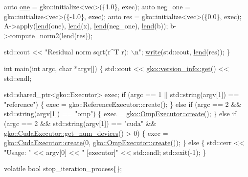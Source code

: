 \begin{DoxyCodeInclude}
    \textcolor{keyword}{auto} \hyperlink{namespacegko_a0059e27f8f4bc348ff65c1e60caf47c8}{one} = gko::initialize<vec>(\{1.0\}, exec);
    \textcolor{keyword}{auto} neg\_one = gko::initialize<vec>(\{-1.0\}, exec);
    \textcolor{keyword}{auto} res = gko::initialize<vec>(\{0.0\}, exec);
    A->apply(\hyperlink{namespacegko_aa8cb4876b72e5e1036ea9575443c439b}{lend}(one), \hyperlink{namespacegko_aa8cb4876b72e5e1036ea9575443c439b}{lend}(x), \hyperlink{namespacegko_aa8cb4876b72e5e1036ea9575443c439b}{lend}(neg\_one), \hyperlink{namespacegko_aa8cb4876b72e5e1036ea9575443c439b}{lend}(b));
    b->compute\_norm2(\hyperlink{namespacegko_aa8cb4876b72e5e1036ea9575443c439b}{lend}(res));

    std::cout << \textcolor{stringliteral}{"Residual norm sqrt(r^T r): \(\backslash\)n"};
    \hyperlink{namespacegko_a859dc47a462721d83728d91ab7fa2148}{write}(std::cout, \hyperlink{namespacegko_aa8cb4876b72e5e1036ea9575443c439b}{lend}(res));
\}


\textcolor{keywordtype}{int} main(\textcolor{keywordtype}{int} argc, \textcolor{keywordtype}{char} *argv[])
\{
    std::cout << \hyperlink{classgko_1_1version__info_a6daeb8a087cfb57fa055526fc133d8eb}{gko::version\_info::get}() << std::endl;

    std::shared\_ptr<gko::Executor> exec;
    \textcolor{keywordflow}{if} (argc == 1 || std::string(argv[1]) == \textcolor{stringliteral}{"reference"}) \{
        exec = gko::ReferenceExecutor::create();
    \} \textcolor{keywordflow}{else} \textcolor{keywordflow}{if} (argc == 2 && std::string(argv[1]) == \textcolor{stringliteral}{"omp"}) \{
        exec = \hyperlink{classgko_1_1OmpExecutor_a33ca05fdd0fc928ee262fc9425304874}{gko::OmpExecutor::create}();
    \} \textcolor{keywordflow}{else} \textcolor{keywordflow}{if} (argc == 2 && std::string(argv[1]) == \textcolor{stringliteral}{"cuda"} &&
               \hyperlink{classgko_1_1CudaExecutor_aef0258494d14de0e56149b920c5173e5}{gko::CudaExecutor::get\_num\_devices}() > 0) \{
        exec = \hyperlink{classgko_1_1CudaExecutor_a2718a92034350650ef406ffdb60db090}{gko::CudaExecutor::create}(0, 
      \hyperlink{classgko_1_1OmpExecutor_a33ca05fdd0fc928ee262fc9425304874}{gko::OmpExecutor::create}());
    \} \textcolor{keywordflow}{else} \{
        std::cerr << \textcolor{stringliteral}{"Usage: "} << argv[0] << \textcolor{stringliteral}{" [executor]"} << std::endl;
        std::exit(-1);
    \}

    \textcolor{keyword}{volatile} \textcolor{keywordtype}{bool} stop\_iteration\_process\{\};


\end{DoxyCodeInclude}
